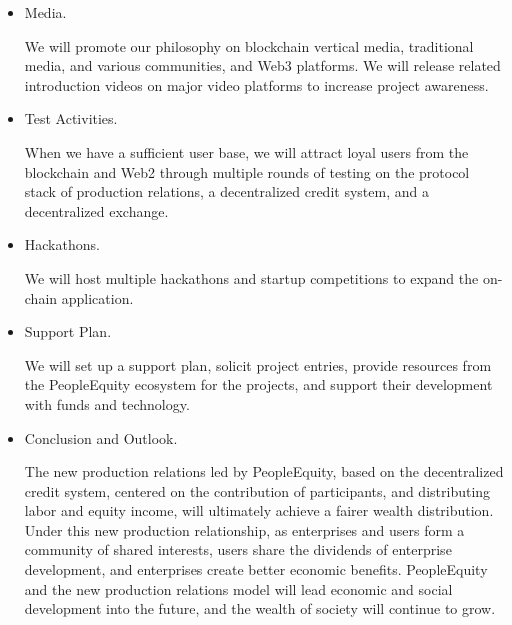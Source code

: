 \documentclass{article}
\begin{document}
\begin{itemize}
   \item Media.

   We will promote our philosophy on blockchain vertical media, traditional media, and various communities, and Web3 platforms. We will release related introduction videos on major video platforms to increase project awareness.

   \item Test Activities.

   When we have a sufficient user base, we will attract loyal users from the blockchain and Web2 through multiple rounds of testing on the protocol stack of production relations, a decentralized credit system, and a decentralized exchange.

   \item Hackathons.

   We will host multiple hackathons and startup competitions to expand the on-chain application.

   \item Support Plan.
   
   We will set up a support plan, solicit project entries, provide resources from the PeopleEquity ecosystem for the projects, and support their development with funds and technology.

   \item Conclusion and Outlook.

   The new production relations led by PeopleEquity, based on the decentralized credit system, centered on the contribution of participants, and distributing labor and equity income, will ultimately achieve a fairer wealth distribution. Under this new production relationship, as enterprises and users form a community of shared interests, users share the dividends of enterprise development, and enterprises create better economic benefits. PeopleEquity and the new production relations model will lead economic and social development into the future, and the wealth of society will continue to grow.
\end{itemize}


\small{
    
}
\end{document}
